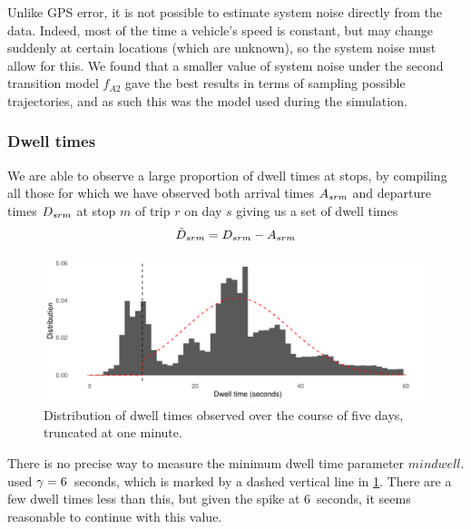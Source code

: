 Unlike GPS error, it is not possible to estimate system noise directly from the data. Indeed, most of the time a vehicle's speed is constant, but may change suddenly at certain locations (which are unknown), so the system noise must allow for this. We found that a smaller value of system noise under the second transition model $f_{A2}$ gave the best results in terms of sampling possible trajectories, and as such this was the model used during the simulation.



\subsubsection{Dwell times}
\label{sec:pf_params_dwell}

We are able to observe a large proportion of dwell times at stops, by compiling all those for which we have observed both arrival times $A_{srm}$ and departure times $D_{srm}$ at stop $m$ of trip $r$ on day $s$ giving us a set of dwell times
\begin{equation}
\label{eq:dwell_time_obs}
\tilde{D}_{srm} = D_{srm} - A_{srm}
\end{equation}

\begin{knitrout}\small
{}\color{fgcolor}\begin{figure}
\includegraphics[width=\maxwidth]{figure/observed_dwell-1} \caption[Distribution of dwell times observed over the course of five days, truncated at one minute]{Distribution of dwell times observed over the course of five days, truncated at one minute.}\label{fig:observed_dwell}
\end{figure}


\end{knitrout}

There is no precise way to measure the minimum dwell time parameter $mindwell$. \cite{Hans_2015} used $\gamma = 6$~seconds, which is marked by a dashed vertical line in \cref{fig:observed_dwell}. There are a few dwell times less than this, but given the spike at 6~seconds, it seems reasonable to continue with this value.

